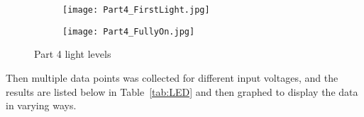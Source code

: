 \documentclass{article}
\begin{document}
\vspace{2em}


\begin{figure}[h] %
    \centering
    \begin{subfigure}[t]{0.49\textwidth}
        \centering
        \texttt{[image: Part4\_FirstLight.jpg]}
        \label{fig:FirstLight}
    \end{subfigure}
    \hfill
    \begin{subfigure}[t]{0.49\textwidth}
        \centering
        \texttt{[image: Part4\_FullyOn.jpg]}
        \label{fig:Bright}
    \end{subfigure}
    \caption{Part 4 light levels}
    \label{fig:Part4States}
\end{figure}

Then multiple data points was collected for different input voltages, and the results are listed below in Table~\ref{tab:LED} and then graphed to display the data in varying ways.


\begin{table}[htbp] %
  \centering
  \caption{LED values}
  \label{tab:LED}%
\end{table}

\clearpage

\end{document}
